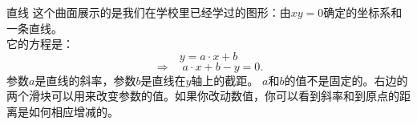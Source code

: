 ﻿\begin{surferPage}{直线}
这个曲面展示的是我们在学校里已经学过的图形：由$xy=0$确定的坐标系和一条直线。\\它的方程是：
\[y=a\cdot x + b\]
\[ \Rightarrow \quad a\cdot x +b -y=0.\]
参数$a$是直线的斜率，参数$b$是直线在$y$轴上的截距。
\newline \newline
$a$和$b$的值不是固定的。右边的两个滑块可以用来改变参数的值。如果你改动数值，你可以看到斜率和到原点的距离是如何相应增减的。
\end{surferPage}
